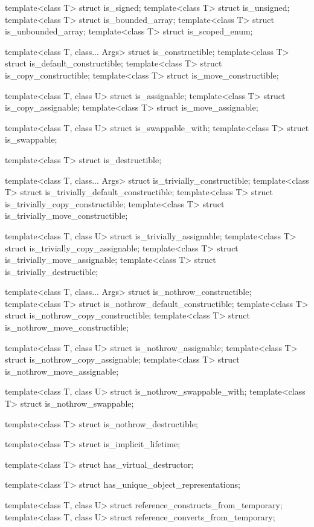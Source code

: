 \begin{codeblock}
{  template<class T> struct is_signed;
  template<class T> struct is_unsigned;
  template<class T> struct is_bounded_array;
  template<class T> struct is_unbounded_array;
  template<class T> struct is_scoped_enum;

  template<class T, class... Args> struct is_constructible;
  template<class T> struct is_default_constructible;
  template<class T> struct is_copy_constructible;
  template<class T> struct is_move_constructible;

  template<class T, class U> struct is_assignable;
  template<class T> struct is_copy_assignable;
  template<class T> struct is_move_assignable;

  template<class T, class U> struct is_swappable_with;
  template<class T> struct is_swappable;

  template<class T> struct is_destructible;

  template<class T, class... Args> struct is_trivially_constructible;
  template<class T> struct is_trivially_default_constructible;
  template<class T> struct is_trivially_copy_constructible;
  template<class T> struct is_trivially_move_constructible;

  template<class T, class U> struct is_trivially_assignable;
  template<class T> struct is_trivially_copy_assignable;
  template<class T> struct is_trivially_move_assignable;
  template<class T> struct is_trivially_destructible;

  template<class T, class... Args> struct is_nothrow_constructible;
  template<class T> struct is_nothrow_default_constructible;
  template<class T> struct is_nothrow_copy_constructible;
  template<class T> struct is_nothrow_move_constructible;

  template<class T, class U> struct is_nothrow_assignable;
  template<class T> struct is_nothrow_copy_assignable;
  template<class T> struct is_nothrow_move_assignable;

  template<class T, class U> struct is_nothrow_swappable_with;
  template<class T> struct is_nothrow_swappable;

  template<class T> struct is_nothrow_destructible;

  template<class T> struct is_implicit_lifetime;

  template<class T> struct has_virtual_destructor;

  template<class T> struct has_unique_object_representations;

  template<class T, class U> struct reference_constructs_from_temporary;
  template<class T, class U> struct reference_converts_from_temporary;

}
\end{codeblock}
